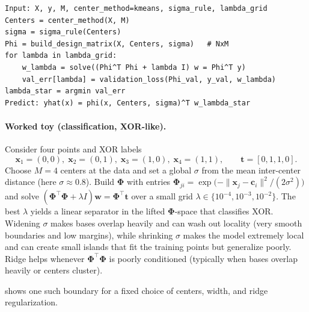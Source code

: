 \begin{tcolorbox}[summarybox, title={Practical RBFN training (pseudocode)}]
\begin{verbatim}
Input: X, y, M, center_method=kmeans, sigma_rule, lambda_grid
Centers = center_method(X, M)
sigma = sigma_rule(Centers)
Phi = build_design_matrix(X, Centers, sigma)   # NxM
for lambda in lambda_grid:
    w_lambda = solve((Phi^T Phi + lambda I) w = Phi^T y)
    val_err[lambda] = validation_loss(Phi_val, y_val, w_lambda)
lambda_star = argmin val_err
Predict: yhat(x) = phi(x, Centers, sigma)^T w_lambda_star
\end{verbatim}
\end{tcolorbox}

\paragraph{Worked toy (classification, XOR-like).} Consider four points and XOR labels
\[
\mathbf{x}_1=(0,0),\;\mathbf{x}_2=(0,1),\;\mathbf{x}_3=(1,0),\;\mathbf{x}_4=(1,1),
\qquad \mathbf{t}=[0,1,1,0].
\]
Choose \(M=4\) centers at the data and set a global \(\sigma\) from the mean inter-center distance (here \(\sigma\approx 0.8\)). Build \(\boldsymbol{\Phi}\) with entries \(\boldsymbol{\Phi}_{ji}=\exp\!\big(-\|\mathbf{x}_j-\mathbf{c}_i\|^2/(2\sigma^2)\big)\) and solve \((\boldsymbol{\Phi}^\top\boldsymbol{\Phi}+\lambda I)\mathbf{w}=\boldsymbol{\Phi}^\top\mathbf{t}\) over a small grid \(\lambda\in\{10^{-4},10^{-3},10^{-2}\}\). The best \(\lambda\) yields a linear separator in the lifted \(\boldsymbol{\Phi}\)-space that classifies XOR. Widening \(\sigma\) makes bases overlap heavily and can wash out locality (very smooth boundaries and low margins), while shrinking \(\sigma\) makes the model extremely local and can create small islands that fit the training points but generalize poorly. Ridge helps whenever \(\boldsymbol{\Phi}^\top\boldsymbol{\Phi}\) is poorly conditioned (typically when bases overlap heavily or centers cluster).

 shows one such boundary for a fixed choice of centers, width, and ridge regularization.

